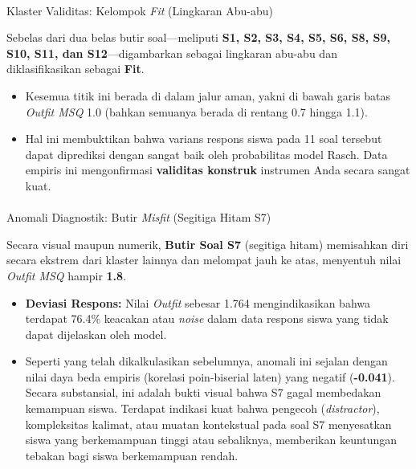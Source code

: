 \documentclass[
]{article}
\makeatletter
\let\oldparagraph\paragraph
\renewcommand{\paragraph}{
    \@ifstar
      \xxxParagraphStar
      \xxxParagraphNoStar
  }
\newcommand{\xxxParagraphStar}[1]{\oldparagraph*{#1}\mbox{}}
\newcommand{\xxxParagraphNoStar}[1]{\oldparagraph{#1}\mbox{}}
\makeatother
\begin{document}
\paragraph{\texorpdfstring{Klaster Validitas: Kelompok \emph{Fit}
(Lingkaran
Abu-abu)}{Klaster Validitas: Kelompok Fit (Lingkaran Abu-abu)}}\label{klaster-validitas-kelompok-fit-lingkaran-abu-abu}

Sebelas dari dua belas butir soal---meliputi \textbf{S1, S2, S3, S4, S5,
S6, S8, S9, S10, S11, dan S12}---digambarkan sebagai lingkaran abu-abu
dan diklasifikasikan sebagai \textbf{Fit}.

\begin{itemize}
\item
  Kesemua titik ini berada di dalam jalur aman, yakni di bawah garis
  batas \emph{Outfit MSQ} 1.0 (bahkan semuanya berada di rentang 0.7
  hingga 1.1).
\item
  Hal ini membuktikan bahwa varians respons siswa pada 11 soal tersebut
  dapat diprediksi dengan sangat baik oleh probabilitas model Rasch.
  Data empiris ini mengonfirmasi \textbf{validitas konstruk} instrumen
  Anda secara sangat kuat.
\end{itemize}

\paragraph{\texorpdfstring{Anomali Diagnostik: Butir \emph{Misfit}
(Segitiga Hitam
S7)}{Anomali Diagnostik: Butir Misfit (Segitiga Hitam S7)}}\label{anomali-diagnostik-butir-misfit-segitiga-hitam-s7}

Secara visual maupun numerik, \textbf{Butir Soal S7} (segitiga hitam)
memisahkan diri secara ekstrem dari klaster lainnya dan melompat jauh ke
atas, menyentuh nilai \emph{Outfit MSQ} hampir \textbf{1.8}.

\begin{itemize}
\item
  \textbf{Deviasi Respons:} Nilai \emph{Outfit} sebesar 1.764
  mengindikasikan bahwa terdapat 76.4\% keacakan atau \emph{noise} dalam
  data respons siswa yang tidak dapat dijelaskan oleh model.
\item
  Seperti yang telah dikalkulasikan sebelumnya, anomali ini sejalan
  dengan nilai daya beda empiris (korelasi poin-biserial laten) yang
  negatif (\textbf{-0.041}). Secara substansial, ini adalah bukti visual
  bahwa S7 gagal membedakan kemampuan siswa. Terdapat indikasi kuat
  bahwa pengecoh (\emph{distractor}), kompleksitas kalimat, atau muatan
  kontekstual pada soal S7 menyesatkan siswa yang berkemampuan tinggi
  atau sebaliknya, memberikan keuntungan tebakan bagi siswa berkemampuan
  rendah.
\end{itemize}
\end{document}
